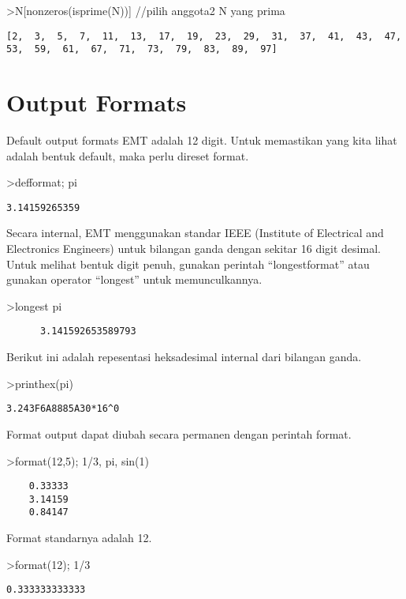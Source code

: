 \documentclass[
]{book}
\begin{document}
\textgreater N{[}nonzeros(isprime(N)){]} //pilih anggota2 N yang prima

\begin{verbatim}
[2,  3,  5,  7,  11,  13,  17,  19,  23,  29,  31,  37,  41,  43,  47,
53,  59,  61,  67,  71,  73,  79,  83,  89,  97]
\end{verbatim}

\chapter{Output Formats}\label{output-formats}

Default output formats EMT adalah 12 digit. Untuk memastikan yang kita lihat adalah bentuk default, maka perlu direset format.

\textgreater defformat; pi

\begin{verbatim}
3.14159265359
\end{verbatim}

Secara internal, EMT menggunakan standar IEEE (Institute of Electrical and Electronics Engineers) untuk bilangan ganda dengan sekitar 16 digit desimal. Untuk melihat bentuk digit penuh, gunakan perintah ``longestformat'' atau gunakan operator ``longest'' untuk memunculkannya.

\textgreater longest pi

\begin{verbatim}
      3.141592653589793 
\end{verbatim}

Berikut ini adalah repesentasi heksadesimal internal dari bilangan ganda.

\textgreater printhex(pi)

\begin{verbatim}
3.243F6A8885A30*16^0
\end{verbatim}

Format output dapat diubah secara permanen dengan perintah format.

\textgreater format(12,5); 1/3, pi, sin(1)

\begin{verbatim}
    0.33333 
    3.14159 
    0.84147 
\end{verbatim}

Format standarnya adalah 12.

\textgreater format(12); 1/3

\begin{verbatim}
0.333333333333
\end{verbatim}
\end{document}
